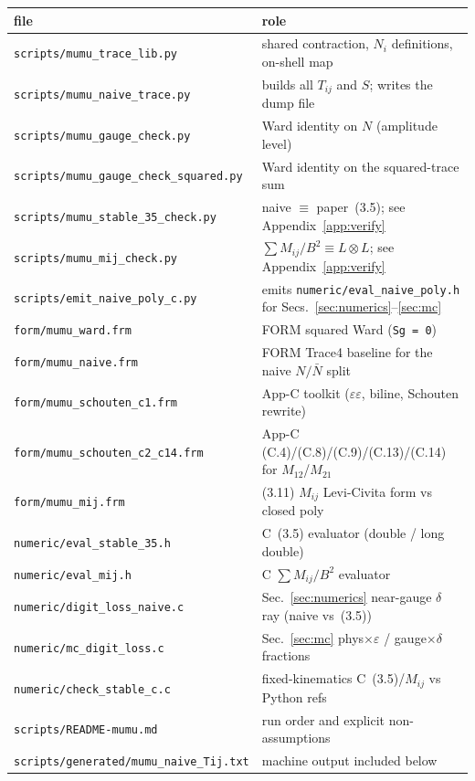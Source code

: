 \documentclass[11pt]{article}
\begin{document}
\begin{center}
\begin{tabular}{@{}lp{}@{}}
\toprule
file & role \\
\midrule
\texttt{scripts/mumu\_trace\_lib.py}
  & shared contraction, $N_i$ definitions, on-shell map \\
\texttt{scripts/mumu\_naive\_trace.py}
  & builds all $T_{ij}$ and $S$; writes the dump file \\
\texttt{scripts/mumu\_gauge\_check.py}
  & Ward identity on $N$ (amplitude level) \\
\texttt{scripts/mumu\_gauge\_check\_squared.py}
  & Ward identity on the squared-trace sum \\
\texttt{scripts/mumu\_stable\_35\_check.py}
  & naive $\equiv$ paper~(3.5); see Appendix~\ref{app:verify} \\
\texttt{scripts/mumu\_mij\_check.py}
  & $\sum M_{ij}/B^2\equiv L\otimes L$; see Appendix~\ref{app:verify} \\
\texttt{scripts/emit\_naive\_poly\_c.py}
  & emits \texttt{numeric/eval\_naive\_poly.h} for Secs.~\ref{sec:numerics}--\ref{sec:mc} \\
\texttt{form/mumu\_ward.frm}
  & FORM squared Ward (\texttt{Sg = 0}) \\
\texttt{form/mumu\_naive.frm}
  & FORM Trace4 baseline for the naive $N/\bar N$ split \\
\texttt{form/mumu\_schouten\_c1.frm}
  & App-C toolkit ($\varepsilon\varepsilon$, biline, Schouten rewrite) \\
\texttt{form/mumu\_schouten\_c2\_c14.frm}
  & App-C (C.4)/(C.8)/(C.9)/(C.13)/(C.14) for $M_{12}$/$M_{21}$ \\
\texttt{form/mumu\_mij.frm}
  & (3.11) $M_{ij}$ Levi-Civita form vs closed poly \\
\texttt{numeric/eval\_stable\_35.h}
  & C~(3.5) evaluator (double / long double) \\
\texttt{numeric/eval\_mij.h}
  & C $\sum M_{ij}/B^2$ evaluator \\
\texttt{numeric/digit\_loss\_naive.c}
  & Sec.~\ref{sec:numerics} near-gauge $\delta$ ray (naive vs~(3.5)) \\
\texttt{numeric/mc\_digit\_loss.c}
  & Sec.~\ref{sec:mc} phys$\times\varepsilon$ / gauge$\times\delta$ fractions \\
\texttt{numeric/check\_stable\_c.c}
  & fixed-kinematics C~(3.5)/$M_{ij}$ vs Python refs \\
\texttt{scripts/README-mumu.md}
  & run order and explicit non-assumptions \\
\texttt{scripts/generated/mumu\_naive\_Tij.txt}
  & machine output included below \\
\bottomrule
\end{tabular}
\end{center}
\end{document}
